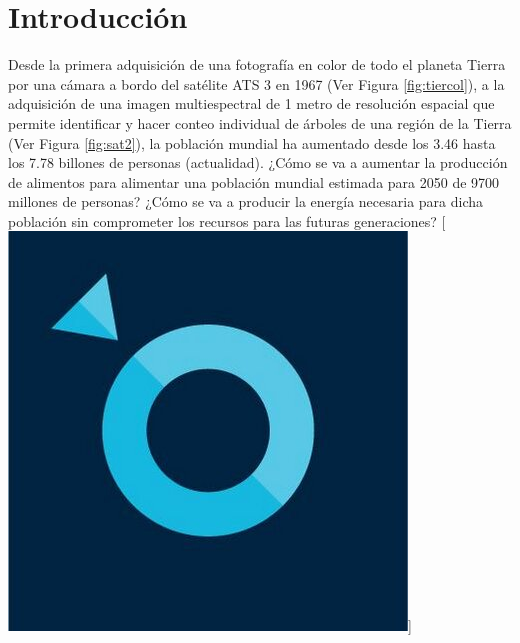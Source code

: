 \singlespacing
\chapter{Introducción}
\label{chap:introd}


\hspace{0.5cm}Desde la primera adquisición de una fotografía en color de todo el planeta Tierra por una cámara a bordo del satélite ATS 3 en 1967 (Ver Figura \ref{fig:tiercol}), a la adquisición de una imagen multiespectral de 1 metro de resolución espacial que permite identificar y hacer conteo individual de árboles de una región de la Tierra (Ver Figura \ref{fig:sat2}), la población mundial ha aumentado desde los 3.46 hasta los 7.78 billones de personas (actualidad). ¿Cómo se va a aumentar la producción de alimentos para alimentar una población mundial estimada para 2050 de 9700 millones de personas? ¿Cómo se va a producir la energía necesaria para dicha población sin comprometer los recursos para las futuras generaciones? [\href{https://satellogic.com/}{\includegraphics[scale=0.06]{Figs/sate_icon.png}}]

